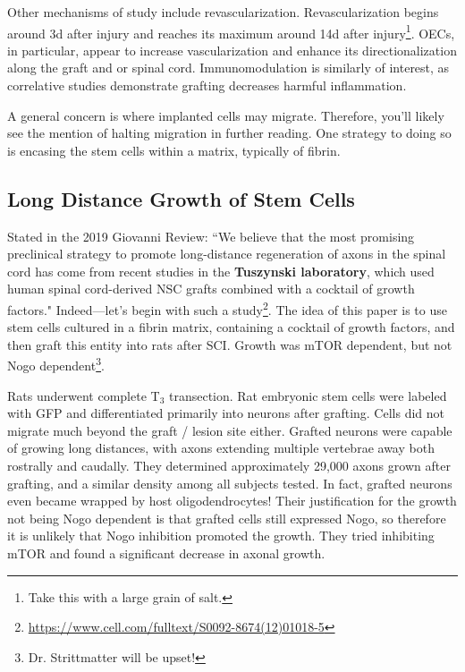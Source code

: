 \documentclass[12pt]{report}
\begin{document}
Other mechanisms of study include revascularization. Revascularization begins around 3d after injury and reaches its maximum around 14d after injury\footnote{Take this with a large grain of salt.}. OECs, in particular, appear to increase vascularization and enhance its directionalization along the graft and or spinal cord. Immunomodulation is similarly of interest, as correlative studies demonstrate grafting decreases harmful inflammation.\newline

A general concern is where implanted cells may migrate. Therefore, you'll likely see the mention of halting migration in further reading. One strategy to doing so is encasing the stem cells within a matrix, typically of fibrin. 


\subsection{Long Distance Growth of Stem Cells}

Stated in the 2019 Giovanni Review: ``We believe that the most promising preclinical strategy to promote long-distance regeneration of axons in the spinal cord has come from recent studies in the \textbf{Tuszynski laboratory}, which used human spinal cord-derived NSC grafts combined with a cocktail of growth factors." Indeed---let's begin with such a study\footnote{\url{https://www.cell.com/fulltext/S0092-8674(12)01018-5}}. The idea of this paper is to use stem cells cultured in a fibrin matrix, containing a cocktail of growth factors, and then graft this entity into rats after SCI. Growth was mTOR dependent, but not Nogo dependent\footnote{Dr. Strittmatter will be upset!}.\newline

Rats underwent complete T$_3$ transection. Rat embryonic stem cells were labeled with GFP and differentiated primarily into neurons after grafting. Cells did not migrate much beyond the graft / lesion site either. Grafted neurons were capable of growing long distances, with axons extending multiple vertebrae away both rostrally and caudally. They determined approximately 29,000 axons grown after grafting, and a similar density among all subjects tested. In fact, grafted neurons even became wrapped by host oligodendrocytes! Their justification for the growth not being Nogo dependent is that grafted cells still expressed Nogo, so therefore it is unlikely that Nogo inhibition promoted the growth. They tried inhibiting mTOR and found a significant decrease in axonal growth.\newline
\end{document}
